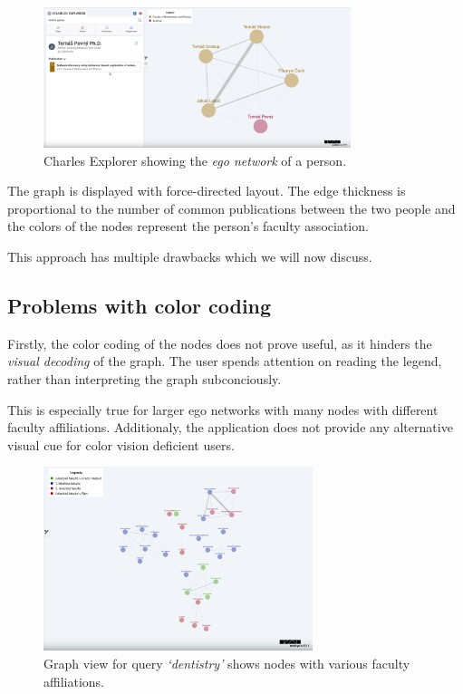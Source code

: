 \begin{figure}[ht!]
    \captionsetup{width=.9\linewidth}
    \includegraphics[width=0.8\textwidth]{../img/charles-explorer-old-view.png}
    \centering
    \caption{Charles Explorer showing the \textit{ego network} of a person.}
\end{figure}

The graph is displayed with force-directed layout. The edge thickness is proportional to the number of common publications between 
the two people and the colors of the nodes represent the person's faculty association.

This approach has multiple drawbacks which we will now discuss.

\subsection{Problems with color coding} \label{sec:color-coding}

Firstly, the color coding of the nodes does not prove useful, as it hinders the \textit{visual decoding} of the graph.
The user spends attention on reading the legend, rather than interpreting the graph subconciously.

This is especially true for larger ego networks with many nodes with different faculty affiliations. 
Additionaly, the application does not provide any alternative visual cue for color vision deficient users.

\begin{figure}[ht!]
    \captionsetup{width=.9\linewidth}
    \includegraphics[width=0.7\textwidth]{../img/color-coding.png}
    \centering
    \caption{Graph view for query \textit{`dentistry'} shows nodes with various faculty affiliations.}
\end{figure}

